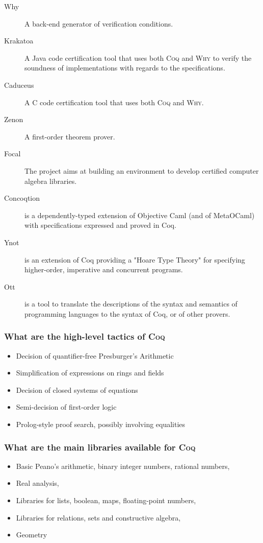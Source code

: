 \documentclass[a4paper,pdftex]{article}
\def\Question#1{\stepcounter{question}\subsubsection{#1}}
\def\Coq{\textsc{Coq}}
\def\Why{\textsc{Why}}
\begin{document}
\begin{description}
\item[Why] A back-end generator of verification conditions.
\item[Krakatoa] A Java code certification tool that uses both {\Coq} and {\Why} to verify the soundness of implementations with regards to the specifications.
\item[Caduceus] A C code certification tool that uses both {\Coq} and \Why.
\item[Zenon] A first-order theorem prover.
\item[Focal] The  project aims at building an environment to develop certified computer algebra libraries. 
\item[Concoqtion] is a dependently-typed extension of Objective Caml (and of MetaOCaml) with specifications expressed and proved in Coq. 
\item[Ynot] is an extension of Coq providing a "Hoare Type Theory" for specifying higher-order, imperative and concurrent programs.
\item[Ott]is a tool to translate the descriptions of the syntax and semantics of programming languages to the syntax of Coq, or of other provers.
\end{description}

\Question{What are the high-level tactics of \Coq}

\begin{itemize}
\item Decision of quantifier-free Presburger's Arithmetic
\item Simplification of expressions on rings and fields
\item Decision of closed systems of equations
\item Semi-decision of first-order logic
\item Prolog-style proof search, possibly involving equalities
\end{itemize}

\Question{What are the main libraries available for \Coq}

\begin{itemize}
\item Basic Peano's arithmetic, binary integer numbers, rational numbers,
\item Real analysis,
\item Libraries for lists, boolean, maps, floating-point numbers,
\item Libraries for relations, sets and constructive algebra,
\item Geometry
\end{itemize}
\end{document}

